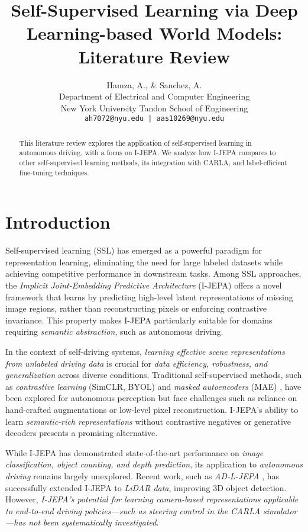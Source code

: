 \documentclass{article}
\title{Self-Supervised Learning via Deep Learning-based World Models: Literature Review}
\author{
    Hamza, A., \& Sanchez, A. \\
    Department of Electrical and Computer Engineering \\
    New York University Tandon School of Engineering \\
    \texttt{ah7072@nyu.edu | aas10269@nyu.edu}
}
\begin{document}
\maketitle

\begin{abstract}
    This literature review explores the application of self-supervised learning in autonomous driving, with a focus on I-JEPA. We analyze how I-JEPA compares to other self-supervised learning methods, its integration with CARLA, and label-efficient fine-tuning techniques.
\end{abstract}

\section{Introduction}

Self-supervised learning (SSL) has emerged as a powerful paradigm for representation learning, eliminating the need for large labeled datasets while achieving competitive performance in downstream tasks. Among SSL approaches, the \textit{Implicit Joint-Embedding Predictive Architecture} (I-JEPA) \citep{jean2023ijepa} offers a novel framework that learns by predicting high-level latent representations of missing image regions, rather than reconstructing pixels or enforcing contrastive invariance. This property makes I-JEPA particularly suitable for domains requiring \textit{semantic abstraction}, such as autonomous driving.

In the context of self-driving systems, \textit{learning effective scene representations from unlabeled driving data} is crucial for \textit{data efficiency, robustness, and generalization} across diverse conditions. Traditional self-supervised methods, such as \textit{contrastive learning} (SimCLR, BYOL) \citep{chen2020simple, grill2020bootstrap} and \textit{masked autoencoders} (MAE) \citep{he2022masked}, have been explored for autonomous perception but face challenges such as reliance on hand-crafted augmentations or low-level pixel reconstruction. I-JEPA's ability to learn \textit{semantic-rich representations} without contrastive negatives or generative decoders presents a promising alternative.

While I-JEPA has demonstrated state-of-the-art performance on \textit{image classification, object counting, and depth prediction}, its application to \textit{autonomous driving} remains largely unexplored. Recent work, such as \textit{AD-L-JEPA} \citep{zhu2025adljepa}, has successfully extended I-JEPA to \textit{LiDAR data}, improving 3D object detection. However, \textit{I-JEPA’s potential for learning camera-based representations applicable to end-to-end driving policies—such as steering control in the CARLA simulator—has not been systematically investigated}.
\end{document}
